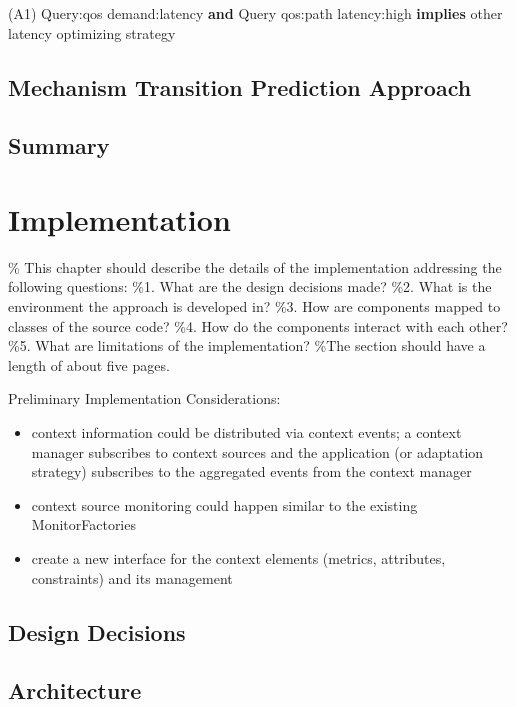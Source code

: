 \begin{center}
(A1) Query:\gls{qos} demand:latency \textbf{and} Query \gls{qos}:path latency:high \textbf{implies} other latency optimizing strategy\\

\end{center}

\section{Mechanism Transition Prediction Approach}
\section{Summary}

\chapter{Implementation}
\% This chapter should describe the details of the implementation addressing the following questions:
\%1. What are the design decisions made?
\%2. What is the environment the approach is developed in?
\%3. How are components mapped to classes of the source code?
\%4. How do the components interact with each other?
\%5. What are limitations of the implementation?
\%The section should have a length of about five pages.


Preliminary Implementation Considerations:
\begin{itemize}
\item context information could be distributed via context events; a context manager subscribes to context sources and the application (or adaptation strategy) subscribes to the aggregated events from the context manager
\item context source monitoring could happen similar to the existing MonitorFactories
\item create a new interface for the context elements (metrics, attributes, constraints) and its management
\end{itemize}


\section{Design Decisions}
\section{Architecture}
